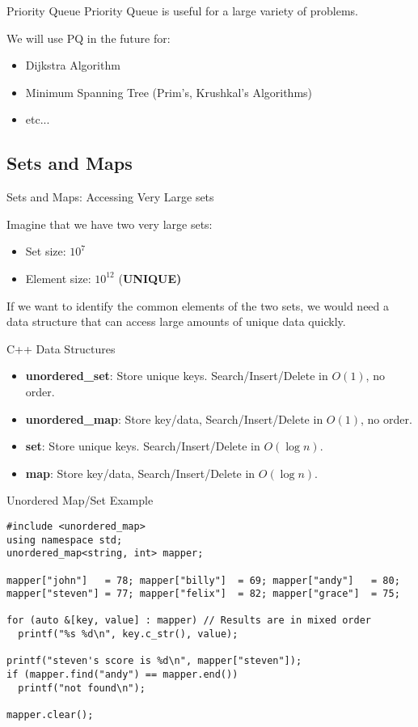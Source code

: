 \begin{frame}{Priority Queue}
  Priority Queue is useful for a large variety of problems.\vfill

  We will use PQ in the future for:
  \begin{itemize}
    \item Dijkstra Algorithm
    \item Minimum Spanning Tree (Prim's, Krushkal's Algorithms)
    \item etc...
  \end{itemize}
\end{frame}

\subsection{Sets and Maps}

\begin{frame}{Sets and Maps: Accessing Very Large sets}

  Imagine that we have two very large sets:
  \begin{itemize}
    \item Set size: $10^7$
    \item Element size: $10^{12}$ (\bf UNIQUE)
  \end{itemize}

  If we want to identify the common elements of the two sets, we would need a data structure that can access large amounts of unique data quickly.

  \begin{block}{C++ Data Structures}
    \begin{itemize}
      \item {\bf unordered\_set}: Store unique keys. Search/Insert/Delete in $O(1)$, no order.
      \item {\bf unordered\_map}: Store key/data, Search/Insert/Delete in $O(1)$, no order.
      \item {\bf set}: Store unique keys. Search/Insert/Delete in $O(\log n)$.
      \item {\bf map}: Store key/data, Search/Insert/Delete in $O(\log n)$.
    \end{itemize}
  \end{block}
\end{frame}

\begin{frame}[fragile]{Unordered Map/Set Example}

{\small
\begin{verbatim}
#include <unordered_map>
using namespace std;
unordered_map<string, int> mapper;

mapper["john"]   = 78; mapper["billy"]  = 69; mapper["andy"]   = 80;
mapper["steven"] = 77; mapper["felix"]  = 82; mapper["grace"]  = 75;

for (auto &[key, value] : mapper) // Results are in mixed order
  printf("%s %d\n", key.c_str(), value);

printf("steven's score is %d\n", mapper["steven"]);
if (mapper.find("andy") == mapper.end())
  printf("not found\n");

mapper.clear();
\end{verbatim}}
\end{frame}


